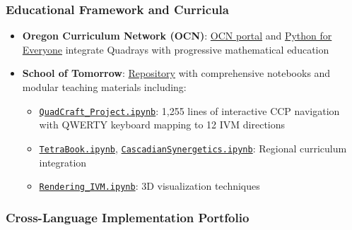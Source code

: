 \documentclass[
  10pt,
]{article}
\providecommand{\tightlist}{%
  \setlength{\itemsep}{0pt}\setlength{\parskip}{0pt}}
\begin{document}
\hypertarget{educational-framework-and-curricula}{%
\subsubsection{Educational Framework and
Curricula}\label{educational-framework-and-curricula}}

\begin{itemize}
\tightlist
\item
  \textbf{Oregon Curriculum Network (OCN)}:
  \href{http://www.4dsolutions.net/ocn/}{OCN portal} and
  \href{http://www.4dsolutions.net/ocn/pymath.html}{Python for Everyone}
  integrate Quadrays with progressive mathematical education
\item
  \textbf{School of Tomorrow}:
  \href{https://github.com/4dsolutions/School_of_Tomorrow}{Repository}
  with comprehensive notebooks and modular teaching materials including:

  \begin{itemize}
  \tightlist
  \item
    \href{https://github.com/4dsolutions/School_of_Tomorrow/blob/master/QuadCraft_Project.ipynb}{\texttt{QuadCraft\_Project.ipynb}}:
    1,255 lines of interactive CCP navigation with QWERTY keyboard
    mapping to 12 IVM directions
  \item
    \href{https://github.com/4dsolutions/School_of_Tomorrow/blob/master/TetraBook.ipynb}{\texttt{TetraBook.ipynb}},
    \href{https://github.com/4dsolutions/School_of_Tomorrow/blob/master/CascadianSynergetics.ipynb}{\texttt{CascadianSynergetics.ipynb}}:
    Regional curriculum integration
  \item
    \href{https://github.com/4dsolutions/School_of_Tomorrow/blob/master/Rendering_IVM.ipynb}{\texttt{Rendering\_IVM.ipynb}}:
    3D visualization techniques
  \end{itemize}
\end{itemize}

\hypertarget{cross-language-implementation-portfolio}{%
\subsubsection{Cross-Language Implementation
Portfolio}\label{cross-language-implementation-portfolio}}
\end{document}
